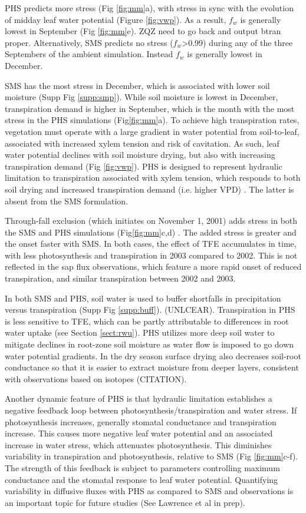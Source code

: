 \documentclass[draft,linenumbers]{agujournal}
\begin{document}
    PHS predicts more stress (Fig \ref{fig:mm}a), with stress in sync with the evolution of midday leaf water potential (Figure \ref{fig:vwp}). As a result, $f_w$ is generally lowest in September (Fig \ref{fig:mm}e). ZQZ need to go back and output btran proper.
    Alternatively, SMS predicts no stress ($f_w$>0.99) during any of the three Septembers of the ambient simulation. Instead $f_w$ is generally lowest in December.
    
    SMS has the most stress in December, which is associated with lower soil moisture (Supp Fig \ref{supp:smp}). While soil moisture is lowest in December, transpiration demand is higher in September, which is the month with the most stress in the PHS simulations (Fig\ref{fig:mm}a). To achieve high transpiration rates, vegetation must operate with a large gradient in water potential from soil-to-leaf, associated with increased xylem tension and risk of cavitation. As such, leaf water potential declines with soil moisture drying, but also with increasing transpiration demand (Fig \ref{fig:vwp}). PHS is designed to represent hydraulic limitation to transpiration associated with xylem tension, which responds to both soil drying and increased transpiration demand (i.e. higher VPD) \citep{sperry2015}. The latter is absent from the SMS formulation.
    
    Through-fall exclusion (which initiates on November 1, 2001) adds stress in both the SMS and PHS simulations (Fig\ref{fig:mm}c,d) .
    The added stress is greater and the onset faster with SMS.
    In both cases, the effect of TFE accumulates in time, with less photosynthesis and transpiration in 2003 compared to 2002.
    This is not reflected in the sap flux observations, which feature a more rapid onset of reduced transpiration, and similar transpiration between 2002 and 2003.
    
    In both SMS and PHS, soil water is used to buffer shortfalls in precipitation versus transpiration (Supp Fig \ref{supp:buff}). (UNLCEAR). Transpiration in PHS is less sensitive to TFE, which can be partly attributable to differences in root water uptake (see Section \ref{sect:rwu}).  PHS utilizes more deep soil water to mitigate declines in root-zone soil moisture as water flow is imposed to go down water potential gradients. In the dry season surface drying also decreases soil-root conductance so that it is easier to extract moisture from deeper layers, consistent with observations based on isotopes (CITATION).
    
    Another dynamic feature of PHS is that hydraulic limitation establishes a negative feedback loop between photosynthesis/transpiration and water stress. If photosynthesis increases, generally stomatal conductance and transpiration increase. This causes more negative leaf water potential and an associated increase in water stress, which attenuates photosynthesis. This diminishes variability in transpiration and photosynthesis, relative to SMS (Fig \ref{fig:mm}c-f). The strength of this feedback is subject to parameters controlling maximum conductance and the stomatal response to leaf water potential. Quantifying variability in diffusive fluxes with PHS as compared to SMS and observations is an important topic for future studies (See Lawrence et al in prep).
    
\end{document}
